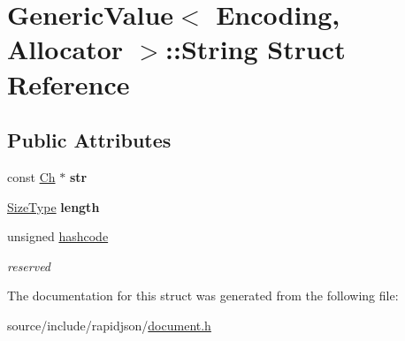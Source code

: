 \hypertarget{struct_generic_value_1_1_string}{}\section{Generic\+Value$<$ Encoding, Allocator $>$\+:\+:String Struct Reference}
\label{struct_generic_value_1_1_string}
\subsection*{Public Attributes}
\begin{DoxyCompactItemize}
\item 
\hypertarget{struct_generic_value_1_1_string_a4eebc5acf3f93ab833efd82abf3ba84d}{}const \hyperlink{class_generic_value_ade0e0ce64ccd5d852da57a35e720bafb}{Ch} $\ast$ {\bfseries str}\label{struct_generic_value_1_1_string_a4eebc5acf3f93ab833efd82abf3ba84d}

\item 
\hypertarget{struct_generic_value_1_1_string_ad6ffab0e093aa8db6e415812ff6443bf}{}\hyperlink{rapidjson_8h_a5ed6e6e67250fadbd041127e6386dcb5}{Size\+Type} {\bfseries length}\label{struct_generic_value_1_1_string_ad6ffab0e093aa8db6e415812ff6443bf}

\item 
\hypertarget{struct_generic_value_1_1_string_a3f1da673591f850e425184f2d8495d66}{}unsigned \hyperlink{struct_generic_value_1_1_string_a3f1da673591f850e425184f2d8495d66}{hashcode}\label{struct_generic_value_1_1_string_a3f1da673591f850e425184f2d8495d66}

\begin{DoxyCompactList}\small\item\em reserved \end{DoxyCompactList}\end{DoxyCompactItemize}


The documentation for this struct was generated from the following file\+:\begin{DoxyCompactItemize}
\item 
source/include/rapidjson/\hyperlink{document_8h}{document.\+h}\end{DoxyCompactItemize}
